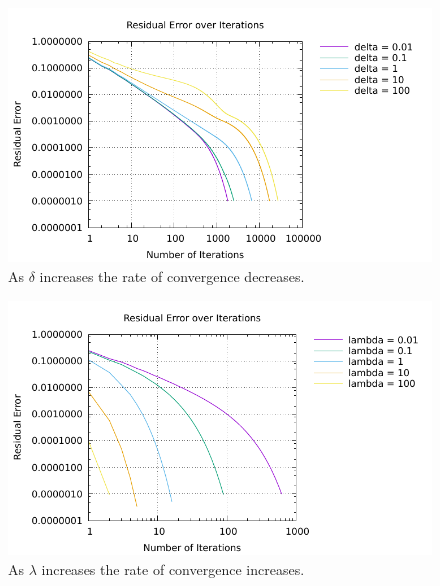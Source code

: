 \documentclass[10pt]{article}
\begin{document}
\clearpage

 \begin{figure}
 \begin{center}
    \includegraphics[width=1\textwidth]{function}
  \end{center}
  \caption{As $\delta$ increases the rate of convergence decreases.
  \label{fig:func_and_deriv}}
\end{figure}

 \begin{figure}
 \begin{center}
    \includegraphics[width=1\textwidth]{function2}
  \end{center}
  \caption{As $\lambda$ increases the rate of convergence increases.
  \label{fig:func2}}
\end{figure}
\end{document}
